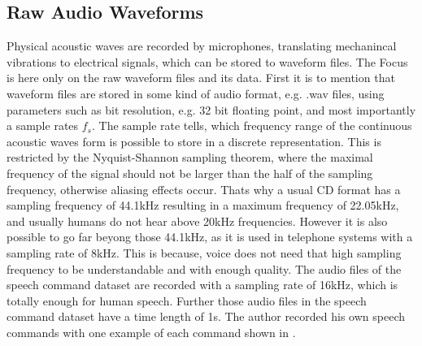 \subsection{Raw Audio Waveforms}\label{sec:raw_audio}
Physical acoustic waves are recorded by microphones, translating mechanincal vibrations to electrical signals, which can be stored to waveform files.
The Focus is here only on the raw waveform files and its data.
First it is to mention that waveform files are stored in some kind of audio format, e.g. .wav files, using parameters such as bit resolution, e.g. 32 bit floating point, and most importantly a sample rates $f_s$. 
The sample rate tells, which frequency range of the continuous acoustic waves form is possible to store in a discrete representation.
This is restricted by the Nyquist-Shannon sampling theorem, where the maximal frequency of the signal should not be larger than the half of the sampling frequency, otherwise aliasing effects occur. 
Thats why a usual CD format has a sampling frequency of 44.1kHz resulting in a maximum frequency of 22.05kHz, and usually humans do not hear above 20kHz frequencies.
However it is also possible to go far beyong those 44.1kHz, as it is used in telephone systems with a sampling rate of 8kHz.
This is because, voice does not need that high sampling frequency to be understandable and with enough quality.
The audio files of the speech command dataset are recorded with a sampling rate of 16kHz, which is totally enough for human speech.
Further those audio files in the speech command dataset have a time length of 1s.
The author recorded his own speech commands with one example of each command shown in .

